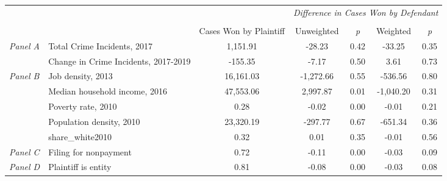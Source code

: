 \begin{tabular}{llccccc}
\toprule
 &  & \textit{} & \multicolumn{4}{c}{\textit{Difference in Cases Won by Defendant}} \\
\cline{4-7}
\\
 &  & Cases Won by Plaintiff & Unweighted & \emph{p} & Weighted & \emph{p} \\
\midrule
\multirow[c]{2}{.75cm}{\textit{Panel A}} & Total Crime Incidents, 2017 & 1,151.91 & -28.23 & 0.42 & -33.25 & 0.35 \\
 & Change in Crime Incidents, 2017-2019 & -155.35 & -7.17 & 0.50 & 3.61 & 0.73 \\
\cline{1-7}
\multirow[c]{5}{.75cm}{\textit{Panel B}} & Job density, 2013 & 16,161.03 & -1,272.66 & 0.55 & -536.56 & 0.80 \\
 & Median household income, 2016 & 47,553.06 & 2,997.87 & 0.01 & -1,040.20 & 0.31 \\
 & Poverty rate, 2010 & 0.28 & -0.02 & 0.00 & -0.01 & 0.21 \\
 & Population density, 2010 & 23,320.19 & -297.77 & 0.67 & -651.34 & 0.36 \\
 & share_white2010 & 0.32 & 0.01 & 0.35 & -0.01 & 0.56 \\
\cline{1-7}
\textit{Panel C} & Filing for nonpayment & 0.72 & -0.11 & 0.00 & -0.03 & 0.09 \\
\cline{1-7}
\textit{Panel D} & Plaintiff is entity & 0.81 & -0.08 & 0.00 & -0.03 & 0.08 \\
\cline{1-7}
\bottomrule
\end{tabular}
